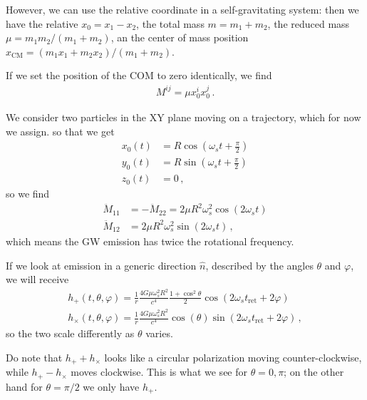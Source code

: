 \documentclass[main.tex]{subfiles}
\begin{document}
However, we can use the relative coordinate in a self-gravitating system: then we have the relative \(x_0 = x_1 - x_2 \), the total mass \(m = m_1 + m_2 \), the reduced mass \(\mu = m_1 m_2 / (m_1 + m_2 )\), an the center of mass position \(x _{\text{CM}} = (m_1 x_1 +m_2 x_2 ) / (m_1 + m_2 )\). 

If we set the position of the COM to zero identically, we find 
%
\begin{align}
M^{ij} = \mu x^{i}_{0} x^{j}_{0}
\,.
\end{align}

We consider two particles in the XY plane moving on a trajectory, which for now we assign. so that we get 
%
\begin{subequations}
\begin{align}
x_0 (t) &= R \cos(\omega_{s} t + \frac{\pi}{2}) \\
y_0 (t) &= R \sin(\omega_{s} t + \frac{\pi}{2}) \\
z_0 (t) &= 0
\,,
\end{align}
\end{subequations}
%
so we find 
%
\begin{subequations}
\begin{align}
\ddot{M}_{11} &= - \ddot{M}_{22} = 2 \mu R^2 \omega_{s}^2 \cos(2 \omega_{s}t)  \\
\ddot{M}_{12} &= 2 \mu R^2\omega_{s}^2  \sin( 2 \omega_{s}t)
\,,
\end{align}
\end{subequations}
%
which means the GW emission has twice the rotational frequency. 

If we look at emission in a generic direction \(\hat{n}\), described by the angles \(\theta \) and \(\varphi \), we will receive 
%
\begin{subequations}
\begin{align}
h_{+} (t, \theta , \varphi ) = \frac{1}{r} \frac{4G \mu \omega_{s}^2 R^2}{c^{4}} \frac{1 + \cos^2\theta }{2} \cos(2 \omega_{s}t _{\text{ret}} + 2 \varphi  ) \\
h_{ \times } (t, \theta , \varphi ) = \frac{1}{r} \frac{4G \mu \omega_{s}^2 R^2}{c^{4}} \cos(\theta ) \sin(2 \omega_{s}t _{\text{ret}} + 2 \varphi  )
\,,
\end{align}
\end{subequations}
%
so the two scale differently as \(\theta \) varies. 

Do note that \(h_{+} + h_{ \times }\) looks like a circular polarization moving counter-clockwise, while \(h_{+} - h_{ \times }\) moves clockwise. This is what we see for \(\theta = 0, \pi \); on the other hand for \(\theta = \pi /2\) we only have \(h_{+}\). 
\end{document}

